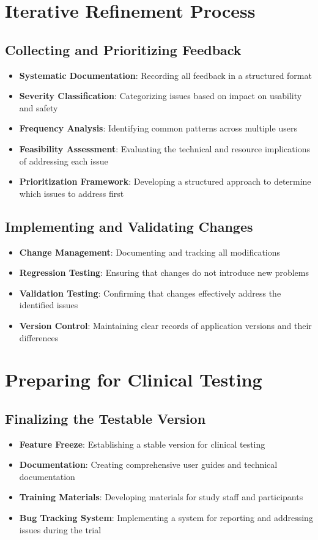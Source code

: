 \section{Iterative Refinement Process}
\subsection{Collecting and Prioritizing Feedback}
\begin{itemize}
    \item \textbf{Systematic Documentation}: Recording all feedback in a structured format
    \item \textbf{Severity Classification}: Categorizing issues based on impact on usability and safety
    \item \textbf{Frequency Analysis}: Identifying common patterns across multiple users
    \item \textbf{Feasibility Assessment}: Evaluating the technical and resource implications of addressing each issue
    \item \textbf{Prioritization Framework}: Developing a structured approach to determine which issues to address first
\end{itemize}

\subsection{Implementing and Validating Changes}
\begin{itemize}
    \item \textbf{Change Management}: Documenting and tracking all modifications
    \item \textbf{Regression Testing}: Ensuring that changes do not introduce new problems
    \item \textbf{Validation Testing}: Confirming that changes effectively address the identified issues
    \item \textbf{Version Control}: Maintaining clear records of application versions and their differences
\end{itemize}

\section{Preparing for Clinical Testing}
\subsection{Finalizing the Testable Version}
\begin{itemize}
    \item \textbf{Feature Freeze}: Establishing a stable version for clinical testing
    \item \textbf{Documentation}: Creating comprehensive user guides and technical documentation
    \item \textbf{Training Materials}: Developing materials for study staff and participants
    \item \textbf{Bug Tracking System}: Implementing a system for reporting and addressing issues during the trial
\end{itemize}

